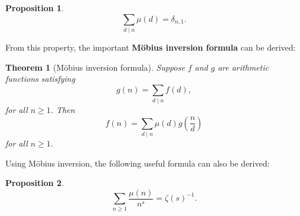 \documentclass[12pt]{book}
\newtheorem{theorem}{Theorem}[section]
\newtheorem{proposition}{Proposition}[section]
\theoremstyle{definition}\newframedtheorem{method}{Method}
\renewcommand{\d}{\delta}
\newcommand{\z}{\zeta}
\newcommand{\<}{\langle}
\renewcommand{\>}{\rangle}
\begin{document}
    \begin{proposition}\label{prop:Mobius_dirac_delta}
      \[
        \sum_{d \mid n}\mu(d) = \d_{n,1}.
      \]
    \end{proposition}

    From this property, the important \textbf{M\"obius inversion formula} can be derived:

    \begin{theorem}[M\"obius inversion formula]
      Suppose $f$ and $g$ are arithmetic functions satisfying
      \[
        g(n) = \sum_{d \mid n}f(d),
      \]
      for all $n \ge 1$. Then
      \[
        f(n) = \sum_{d \mid n}\mu(d)g\left(\frac{n}{d}\right)
      \]
      for all $n \ge 1$.
    \end{theorem}

    Using M\"obius inversion, the following useful formula can also be derived:

    \begin{proposition}\label{prop:Dirichlet_Mobius_is_zeta_inverse}
      \[
        \sum_{n \ge 1}\frac{\mu(n)}{n^{s}} = \z(s)^{-1}.
      \]
    \end{proposition}
\end{document}
